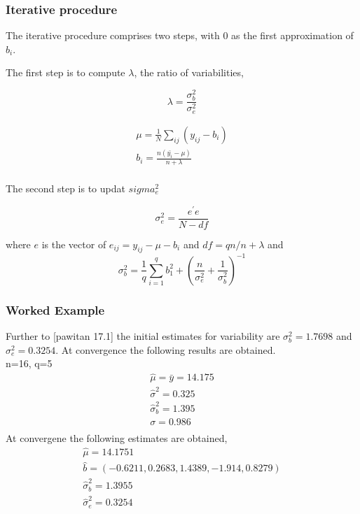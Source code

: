 \documentclass[12pt, a4paper]{report}
\theoremstyle{plain}
\theoremstyle{definition}
\theoremstyle{remark}
\begin{document}
	\subsubsection{Iterative procedure}
	
	The iterative procedure comprises two steps, with $0$ as the first approximation of $b_{i}$.
	
	The first step is to compute $\lambda$, the ratio of variabilities,
	
	\begin{equation*}
	\lambda = \frac{\sigma^2_{b}}{\sigma^2_{e}}
	\end{equation*}
	
	\begin{eqnarray*}
		\mu = \frac{1}{N} \sum_{ij} (y_{ij} - b_{i}) \\
		b_{i} = \frac{n(\bar{y_{i}}-\mu)}{n+ \lambda} \\
	\end{eqnarray*}
	
	
	The second step is to updat $sigma^2_{e}$
	
	\begin{equation}
	\sigma^2_{e} = \frac{e^{\prime}e}{N-df}
	\end{equation}
	
	where $e$ is the vector of $e_{ij} = y_{ij}-\mu-b_{i}$ and $df =
	qn / n+\lambda$ and
	\begin{equation}
	\sigma^{2}_{b} = \frac{1}{q} \sum_{i=1}^{q} b_{1}^2 +
	(\frac{n}{\sigma^2_{e}}+\frac{1}{\sigma^2_{b}})^{-1}
	\end{equation}
	
	\subsubsection{Worked Example}
	
	Further to [pawitan 17.1] the initial estimates for variability
	are $\sigma^{2}_{b} = 1.7698$ and $\sigma^{2}_{e} = 0.3254$. At
	convergence the following results are obtained.
	\\
	n=16, q=5
	\begin{eqnarray*}
		\hat{\mu} = \bar{y} = 14.175 \\
		\hat{\sigma}^2 = 0.325\\
		\hat{\sigma}^2_{b} = 1.395\\
		\sigma  = 0.986 \\
	\end{eqnarray*}
	At convergene the following estimates are obtained,
	\begin{eqnarray*}
		\hat{\mu} = 14.1751 \\
		\hat{b}= (-0.6211, 0.2683,1.4389,-1.914,0.8279)\\
		\hat{\sigma}^2_{b} = 1.3955\\
		\hat{\sigma}^2_{e} = 0.3254\\
	\end{eqnarray*}
	
\end{document}
